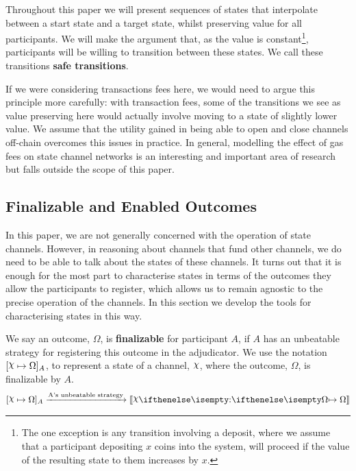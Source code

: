 \documentclass{article}
\begin{document}
Throughout this paper we will present sequences of states that interpolate between a start state and a target state, whilst preserving value for all participants.
We will make the argument that, as the value is constant\footnote{
The one exception is any transition involving a deposit, where we assume that a participant depositing
$x$ coins into the system, will proceed if the value of the resulting state to them increases by $x$.
}, participants will be willing to transition between these states.
We call these transitions \textbf{safe transitions}.

If we were considering transactions fees here, we would need to argue this principle more
carefully: with transaction fees, some of the transitions we see as value preserving here
would actually involve moving to a state of slightly lower value. 
We assume that the utility gained in being able to open and close channels off-chain overcomes
this issues in practice.
In general, modelling the effect of gas fees on state channel networks is an interesting and important area of research but falls outside the scope of this paper.

\subsection{Finalizable and Enabled Outcomes}

In this paper, we are not generally concerned with the operation of state channels.
However, in reasoning about channels that fund other channels, we do need to be able to talk about the states of these channels.
It turns out that it is enough for the most part to characterise states in terms of the outcomes they allow the participants to register, which allows us to remain agnostic to the precise operation of the channels.
In this section we develop the tools for characterising states in this way.

We say an outcome, $\Omega$, is \textbf{finalizable} for participant $A$, if $A$ has an unbeatable
strategy for registering this outcome in the adjudicator.
We use the notation $\finalizable{\rchi}{\Omega}{A}$, to represent a state of a channel, $\rchi$,
where the outcome, $\Omega$, is finalizable by $A$.
\begin{align*}
  \finalizable{\rchi}{\Omega}{A} \xrightarrow{\text{A's unbeatable strategy}} \adj{\holds{\rchi}{}{\Omega}}
\end{align*}
\end{document}
